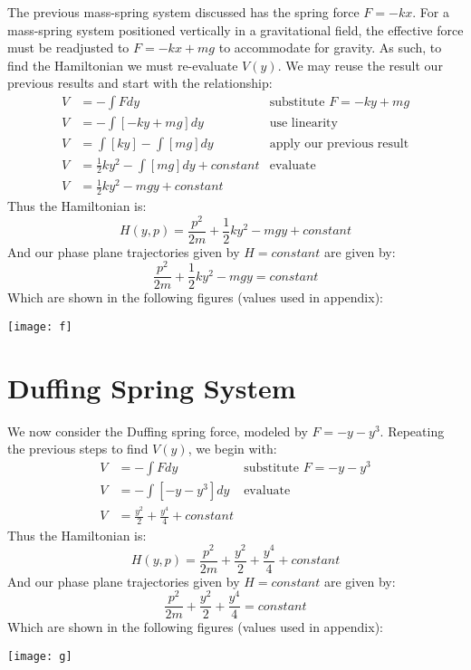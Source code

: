 \documentclass[12pt]{article}
\begin{document}
	\indent \indent The previous mass-spring system discussed has the spring force $F=-kx$. For a mass-spring system positioned vertically in a gravitational field, the effective force must be readjusted to $F=-kx+mg$ to accommodate for gravity. As such, to find the Hamiltonian we must re-evaluate $V(y)$. We may reuse the result our previous results and start with the relationship:
	\begin{align*}
	V&=-\int F dy &\text{substitute $F=-ky+mg$}
	\\
	V&=-\int[-ky+mg]dy &\text{use linearity}
	\\
	V&=\int[ky]-\int[mg]dy &\text{apply our previous result}
	\\
	V&=\frac{1}{2}ky^2-\int[mg]dy+constant &\text{evaluate}
	\\
	V&=\frac{1}{2}ky^2-mgy+constant
	\end{align*}
	\indent Thus the Hamiltonian is:
	\begin{equation*}
	H(y,p)=\frac{p^2}{2m}+\frac{1}{2}ky^2-mgy+constant
	\end{equation*}
	\indent And our phase plane trajectories given by $H=constant$ are given by:
	\begin{equation*}
	\frac{p^2}{2m}+\frac{1}{2}ky^2-mgy=constant
	\end{equation*}
	\indent Which are shown in the following figures (values used in appendix):
	\begin{center}
		\texttt{[image: f]}
	\end{center}
	
	\section{Duffing Spring System}
	
	\indent \indent We now consider the Duffing spring force, modeled by $F=-y-y^3$. Repeating the previous steps to find $V(y)$, we begin with: 
	\begin{align*}
	V&=-\int F dy &\text{substitute $F=-y-y^3$}
	\\
	V&=-\int[-y-y^3]dy &\text{evaluate}
	\\
	V&=\frac{y^2}{2}+\frac{y^4}{4} + constant
	\end{align*}
	\indent Thus the Hamiltonian is:
	\begin{equation*}
	H(y,p)=\frac{p^2}{2m}+\frac{y^2}{2}+\frac{y^4}{4} + constant
	\end{equation*}
	\indent And our phase plane trajectories given by $H=constant$ are given by:
	\begin{equation*}
	\frac{p^2}{2m}+\frac{y^2}{2}+\frac{y^4}{4} = constant
	\end{equation*}
	\indent Which are shown in the following figures (values used in appendix):
	\begin{center}
		\texttt{[image: g]}
	\end{center}
	
\end{document}

